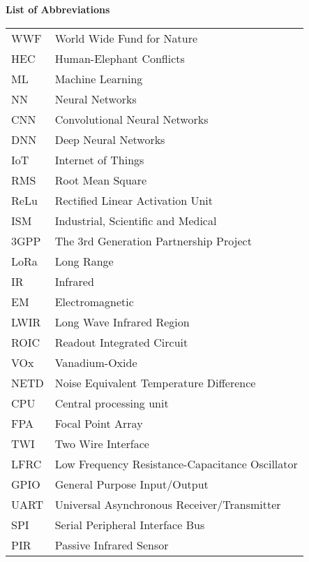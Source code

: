 \begin{poglavje}
\noindent\bfseries List of Abbreviations
\end{poglavje}
\bigskip
\bigskip
\bigskip
\bigskip
\bigskip

\begingroup
\renewcommand\arraystretch{1.3}
\begin{flushleft}
    \begin{longtable}[l]{p{2.5cm}l}
        WWF     & World Wide Fund for Nature\\
        HEC     & Human-Elephant Conflicts\\
        ML      & Machine Learning\\
        NN      & Neural Networks\\
        CNN     & Convolutional Neural Networks\\
        DNN     & Deep Neural Networks\\
        IoT     & Internet of Things\\
        RMS     & Root Mean Square\\
        ReLu    & Rectified Linear Activation Unit\\
        ISM     & Industrial, Scientific and Medical\\
        3GPP    & The 3rd Generation Partnership Project\\
        LoRa    & Long Range\\
        IR      & Infrared\\
        EM      & Electromagnetic\\
        LWIR    & Long Wave Infrared Region\\
        ROIC    & Readout Integrated Circuit\\
        VOx     & Vanadium-Oxide\\
        NETD    & Noise Equivalent Temperature Difference\\
        CPU     & Central processing unit\\
        FPA     & Focal Point Array\\
        TWI     & Two Wire Interface\\
        LFRC    & Low Frequency Resistance-Capacitance Oscillator\\
        GPIO    & General Purpose Input/Output\\
        UART    & Universal Asynchronous Receiver/Transmitter\\
        SPI     & Serial Peripheral Interface Bus\\
        PIR     & Passive Infrared Sensor\\

\end{longtable}
\end{flushleft}
